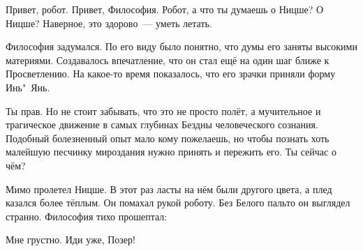 {\small
\begin{dialog}
\X Привет, робот.
\R Привет, Философия.
\X Робот, а что ты думаешь о Ницше?
\R О Ницше? Наверное, это здорово~--- уметь летать.
\end{dialog}

\begin{monolog}
Философия задумался. По его виду было понятно, что думы его заняты высокими материями. Создавалось впечатление, что он стал ещё на один шаг ближе к Просветлению. На какое-то время показалось, что его зрачки приняли форму Инь"~Янь.
\end{monolog}

\begin{dialog}
\X Ты прав. Но не стоит забывать, что это не просто полёт, а мучительное и трагическое движение в самых глубинах Бездны человеческого сознания. Подобный болезненный опыт мало кому пожелаешь, но чтобы познать хоть малейшую песчинку мироздания нужно принять и пережить его.
\R Ты сейчас о чём?
\end{dialog}

\begin{monolog}
Мимо пролетел Ницше. В этот раз ласты на нём были другого цвета, а плед казался более тёплым. Он помахал рукой роботу. Без Белого пальто он выглядел странно. Философия тихо прошептал:
\end{monolog}

\begin{dialog}
\X Мне грустно.
\R Иди уже, Позер!
\end{dialog}
}